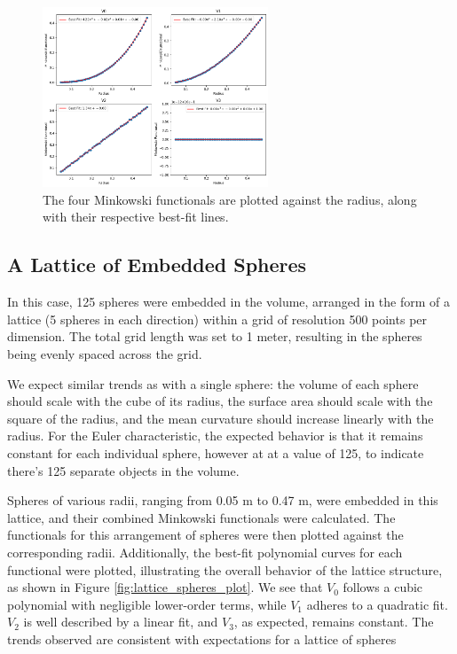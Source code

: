 \documentclass{article}
\begin{document}
\begin{figure}[h!]
    \centering
    \includegraphics[width=0.6\textwidth]{Images/single_sphere_radius_variance.png}
    \caption{The four Minkowski functionals are plotted against the radius, along with their respective best-fit lines.}
    \label{fig:single_sphere_plot}
\end{figure}


\subsection{A Lattice of Embedded Spheres}
In this case, 125 spheres were embedded in the volume, arranged in the form of a lattice (5 spheres in each direction) within a grid of resolution 500 points per dimension. The total grid length was set to 1 meter, resulting in the spheres being evenly spaced across the grid.

We expect similar trends as with a single sphere: the volume of each sphere should scale with the cube of its radius, the surface area should scale with the square of the radius, and the mean curvature should increase linearly with the radius. For the Euler characteristic, the expected behavior is that it remains constant for each individual sphere, however at at a value of 125, to indicate there's 125 separate objects in the volume.

Spheres of various radii, ranging from 0.05 m to 0.47 m, were embedded in this lattice, and their combined Minkowski functionals were calculated. The functionals for this arrangement of spheres were then plotted against the corresponding radii. Additionally, the best-fit polynomial curves for each functional were plotted, illustrating the overall behavior of the lattice structure, as shown in Figure \ref{fig:lattice_spheres_plot}. We see that $V_0$ follows a cubic polynomial with negligible lower-order terms, while $V_1$ adheres to a quadratic fit. $V_2$ is well described by a linear fit, and $V_3$, as expected, remains constant. The trends observed are consistent with expectations for a lattice of spheres
\end{document}
